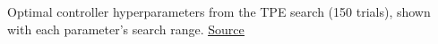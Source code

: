 Optimal controller hyperparameters from the TPE search (150 trials), shown with each parameter's search range. \href{https://github.com/tahmidazam/gg4/blob/main/notebooks/cartesian_control_sweep/cartesian_control_sweep.ipynb}{\underline{Source}}%